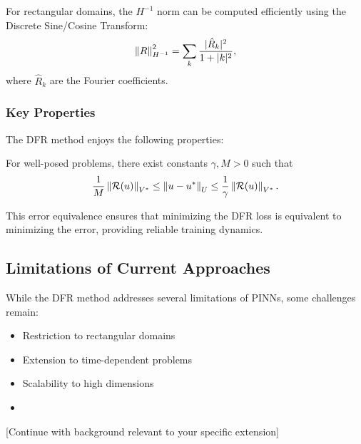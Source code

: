 For rectangular domains, the $H^{-1}$ norm can be computed efficiently using the Discrete Sine/Cosine Transform:
\begin{equation}
    \left\|R\right\|_{H^{-1}}^2 = \sum_{k} \frac{|\hat{R}_k|^2}{1 + |k|^2},
\end{equation}
where $\hat{R}_k$ are the Fourier coefficients.

\subsubsection{Key Properties}

The DFR method enjoys the following properties:
\begin{proposition}
    For well-posed problems, there exist constants $\gamma, M > 0$ such that
    \begin{equation}
        \frac{1}{M}\left\|\mathcal{R}(u)\right\|_{V^*} \leq \left\|u - u^*\right\|_{U} \leq \frac{1}{\gamma}\left\|\mathcal{R}(u)\right\|_{V^*}.
    \end{equation}
\end{proposition}

This error equivalence ensures that minimizing the DFR loss is equivalent to minimizing the error, providing reliable training dynamics.

\subsection{Limitations of Current Approaches}

While the DFR method addresses several limitations of PINNs, some challenges remain:
\begin{itemize}
    \item Restriction to rectangular domains
    \item Extension to time-dependent problems
    \item Scalability to high dimensions
    \item [Add other limitations relevant to your work]
\end{itemize}

[Continue with background relevant to your specific extension]
